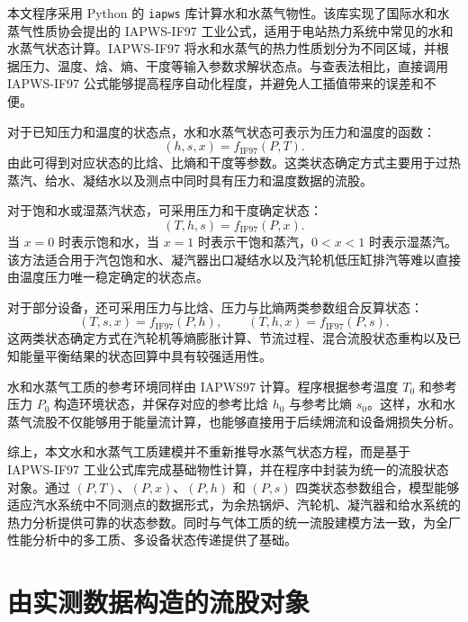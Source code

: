 本文程序采用 Python 的 \verb|iapws| 库计算水和水蒸气物性。该库实现了国际水和水蒸气性质协会提出的 IAPWS-IF97 工业公式，适用于电站热力系统中常见的水和水蒸气状态计算。IAPWS-IF97 将水和水蒸气的热力性质划分为不同区域，并根据压力、温度、焓、熵、干度等输入参数求解状态点。与查表法相比，直接调用 IAPWS-IF97 公式能够提高程序自动化程度，并避免人工插值带来的误差和不便。

对于已知压力和温度的状态点，水和水蒸气状态可表示为压力和温度的函数：
\begin{equation}\label{eq:if97-PT}
\left(h,s,x\right)=f_{\mathrm{IF97}}(P,T).
\end{equation}
由此可得到对应状态的比焓、比熵和干度等参数。这类状态确定方式主要用于过热蒸汽、给水、凝结水以及测点中同时具有压力和温度数据的流股。

对于饱和水或湿蒸汽状态，可采用压力和干度确定状态：
\begin{equation}\label{eq:if97-Px}
\left(T,h,s\right)=f_{\mathrm{IF97}}(P,x).
\end{equation}
当 \(x=0\) 时表示饱和水，当 \(x=1\) 时表示干饱和蒸汽，\(0<x<1\) 时表示湿蒸汽。该方法适合用于汽包饱和水、凝汽器出口凝结水以及汽轮机低压缸排汽等难以直接由温度压力唯一稳定确定的状态点。

对于部分设备，还可采用压力与比焓、压力与比熵两类参数组合反算状态：
\begin{equation}\label{eq:if97-Ph-Ps}
\left(T,s,x\right)=f_{\mathrm{IF97}}(P,h),
\qquad
\left(T,h,x\right)=f_{\mathrm{IF97}}(P,s).
\end{equation}
这两类状态确定方式在汽轮机等熵膨胀计算、节流过程、混合流股状态重构以及已知能量平衡结果的状态回算中具有较强适用性。

水和水蒸气工质的参考环境同样由 IAPWS97 计算。程序根据参考温度 \(T_0\) 和参考压力 \(P_0\) 构造环境状态，并保存对应的参考比焓 \(h_0\) 与参考比熵 \(s_0\)。这样，水和水蒸气流股不仅能够用于能量流计算，也能够直接用于后续㶲流和设备㶲损失分析。

综上，本文水和水蒸气工质建模并不重新推导水蒸气状态方程，而是基于 IAPWS-IF97 工业公式库完成基础物性计算，并在程序中封装为统一的流股状态对象。通过 \((P,T)\)、\((P,x)\)、\((P,h)\) 和 \((P,s)\) 四类状态参数组合，模型能够适应汽水系统中不同测点的数据形式，为余热锅炉、汽轮机、凝汽器和给水系统的热力分析提供可靠的状态参数。同时与气体工质的统一流股建模方法一致，为全厂性能分析中的多工质、多设备状态传递提供了基础。

\section{由实测数据构造的流股对象}

